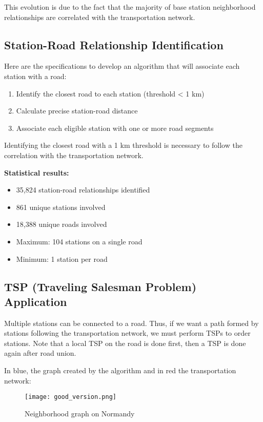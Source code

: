 \documentclass[12pt,a4paper]{report}
\begin{document}
This evolution is due to the fact that the majority of base station neighborhood relationships are correlated with the transportation network.

\subsection{Station-Road Relationship Identification}

Here are the specifications to develop an algorithm that will associate each station with a road:

\begin{enumerate}
    \item Identify the closest road to each station (threshold < 1 km)
    \item Calculate precise station-road distance
    \item Associate each eligible station with one or more road segments
\end{enumerate}

Identifying the closest road with a 1 km threshold is necessary to follow the correlation with the transportation network.

\textbf{Statistical results:}
\begin{itemize}
    \item 35,824 station-road relationships identified
    \item 861 unique stations involved
    \item 18,388 unique roads involved
    \item Maximum: 104 stations on a single road
    \item Minimum: 1 station per road
\end{itemize}

\subsection{TSP (Traveling Salesman Problem) Application}

Multiple stations can be connected to a road. Thus, if we want a path formed by stations following the transportation network, we must perform TSPs to order stations. Note that a local TSP on the road is done first, then a TSP is done again after road union.

In blue, the graph created by the algorithm and in red the transportation network:

\begin{figure}[h]
    \centering
    \texttt{[image: good\_version.png]}
    \caption{Neighborhood graph on Normandy}
    \label{fig:image_unique}
\end{figure}
\end{document}
